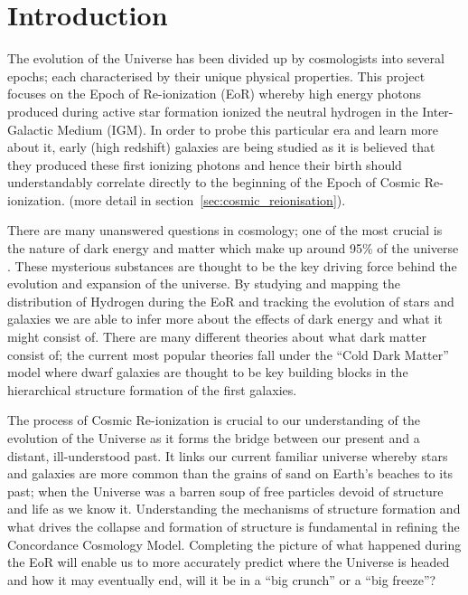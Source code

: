 
\section{Introduction} %
\label{section:Introduction}
	The evolution of the Universe has been divided up by cosmologists into several epochs; each characterised by their unique physical properties. This project focuses on the Epoch of Re-ionization (EoR) whereby high energy photons produced during active star formation ionized the neutral hydrogen in the Inter-Galactic Medium (IGM). In order to probe this particular era and learn more about it, early (high redshift) galaxies are being studied as it is believed that they produced these first ionizing photons and hence their birth should understandably correlate directly to the beginning of the Epoch of Cosmic Re-ionization. (more detail in section~\ref{sec:cosmic_reionisation}).

	There are many unanswered questions in cosmology; one of the most crucial is the nature of dark energy and matter which make up around 95\% of the universe \cite{WMAP9}. These mysterious substances are thought to be the key driving force behind the evolution and expansion of the universe. By studying and mapping the distribution of Hydrogen during the EoR and tracking the evolution of stars and galaxies we are able to infer more about the effects of dark energy and what it might consist of. There are many different theories about what dark matter consist of; the current most popular theories fall under the ``Cold Dark Matter'' model where dwarf galaxies are thought to be key building blocks in the hierarchical structure formation of the first galaxies\cite{Cignoni}.

	The process of Cosmic Re-ionization is crucial to our understanding of the evolution of the Universe as it forms the bridge between our present and a distant, ill-understood past. It links our current familiar universe whereby stars and galaxies are more common than the grains of sand on Earth’s beaches to its past; when the Universe was a barren soup of free particles devoid of structure and life as we know it. Understanding the mechanisms of structure formation and what drives the collapse and formation of structure is fundamental in refining the Concordance Cosmology Model. Completing the picture of what happened during the EoR will enable us to more accurately predict where the Universe is headed and how it may eventually end, will it be in a ``big crunch'' or a ``big freeze''?

